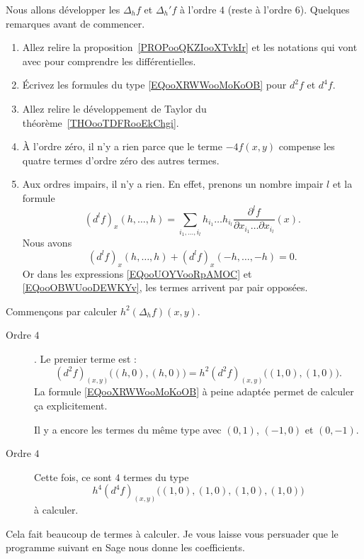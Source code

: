 Nous allons développer les \( \Delta_hf\) et \( \Delta_h'f\) à l'ordre \( 4\) (reste à l'ordre \( 6\)). Quelques remarques avant de commencer.
\begin{enumerate}
	\item
	      Allez relire la proposition~\ref{PROPooQKZIooXTvkIr} et les notations qui vont avec pour comprendre les différentielles.
	\item
	      Écrivez les formules du type \eqref{EQooXRWWooMoKoOB} pour \( d^2f\) et \( d^4f\).
	\item
	      Allez relire le développement de Taylor du théorème~\ref{THOooTDFRooEkChgi}.
	\item
	      À l'ordre zéro, il n'y a rien parce que le terme \( -4f(x,y)\) compense les quatre termes d'ordre zéro des autres termes.
	\item
	      Aux ordres impairs, il n'y a rien. En effet, prenons un nombre impair \( l\) et la formule
	      \begin{equation}
		      (d^lf)_x(h,\ldots, h)=\sum_{i_1,\ldots, i_l}h_{i_1}\ldots h_{i_l}\frac{ \partial^lf }{ \partial x_{i_1}\ldots \partial x_{i_l} }(x).
	      \end{equation}
	      Nous avons
	      \begin{equation}
		      (d^lf)_x(h,\ldots, h)+(d^lf)_x(-h,\ldots, -h)=0.
	      \end{equation}
	      Or dans les expressions \eqref{EQooUOYVooRpAMOC} et \eqref{EQooOBWUooDEWKYv}, les termes arrivent par pair opposées.
\end{enumerate}

Commençons par calculer \( h^2(\Delta_hf)(x,y)\).
\begin{description}
	\item[Ordre \( 4\)]. Le premier terme est :
	      \begin{equation}
		      (d^2f)_{(x,y)}\big( (h,0),(h,0) \big)=h^2(d^2f)_{(x,y)}\big( (1,0),(1,0) \big).
	      \end{equation}
	      La formule \eqref{EQooXRWWooMoKoOB} à peine adaptée permet de calculer ça explicitement.

	      Il y a encore les termes du même type avec \( (0,1)\), \( (-1,0)\) et \( (0,-1)\).

	\item[Ordre \( 4\)]
	      Cette fois, ce sont \( 4\) termes du type
	      \begin{equation}
		      h^4(d^4f)_{(x,y)}\big( (1,0),(1,0),(1,0),(1,0) \big)
	      \end{equation}
	      à calculer.
\end{description}
Cela fait beaucoup de termes à calculer. Je vous laisse vous persuader que le programme suivant en Sage nous donne les coefficients.


